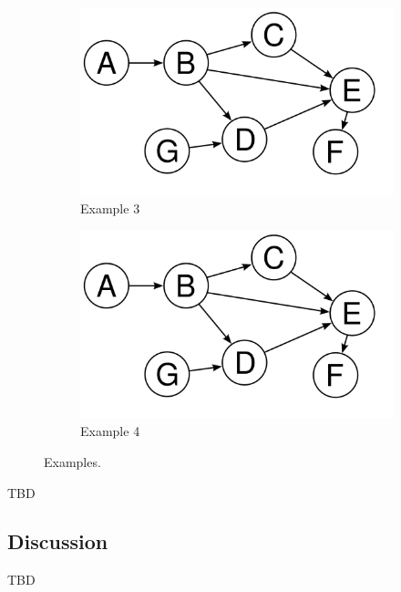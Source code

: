 \begin{figure}[t]
	\begin{subfigure}{\columnwidth}
		\includegraphics[width=\columnwidth]{../gfx/example.png}
		\caption{Example 3}
		\label{figure:examples_3}
	\end{subfigure}
	\hfill
	\begin{subfigure}{\columnwidth}
		\includegraphics[width=\columnwidth]{../gfx/example.png}
		\caption{Example 4}
		\label{figure:examples_4}
	\end{subfigure}
	
	\caption{Examples.}
	\label{figure:examples}
\end{figure}

TBD

\subsection{Discussion}
\label{section:discussion}

TBD
